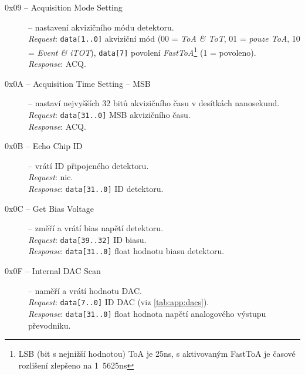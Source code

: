 \begin{description}
    \item[0x09 -- Acquisition Mode Setting] -- nastavení akvizičního módu detektoru.
    \\\textit{Request}: \texttt{data[1..0]} akviziční mód (00 = \textit{ToA \& ToT}, 01 = \textit{pouze ToA}, 10 = \textit{Event \& iTOT}), \texttt{data[7]} povolení \textit{FastToA}\footnote{LSB (bit s nejnižší hodnotou) ToA je \unit{25}{ns}, s aktivovaným FastToA je časové rozlišení zlepšeno na \unit{1.5625}{ns}} (1 = povoleno).
    \\\textit{Response}: ACQ.

    \item[0x0A -- Acquisition Time Setting -- MSB] -- nastaví nejvyšších 32 bitů akvizičního času v desítkách nanosekund.
    \\\textit{Request}: \texttt{data[31..0]} MSB akvizičního času.
    \\\textit{Response}: ACQ.

    \item[0x0B -- Echo Chip ID] -- vrátí ID připojeného detektoru.
    \\\textit{Request}: nic.
    \\\textit{Response}: \texttt{data[31..0]} ID detektoru.

    \item[0x0C -- Get Bias Voltage] -- změří a vrátí bias napětí detektoru.
    \\\textit{Request}: \texttt{data[39..32]} ID biasu.
    \\\textit{Response}: \texttt{data[31..0]} float hodnotu biasu detektoru.


    \item[0x0F -- Internal DAC Scan] -- naměří a vrátí hodnotu DAC.
    \\\textit{Request}: \texttt{data[7..0]} ID DAC (viz \ref{tab:app:dacs}).
    \\\textit{Response}: \texttt{data[31..0]} float hodnota napětí analogového výstupu převodníku.



\end{description}
